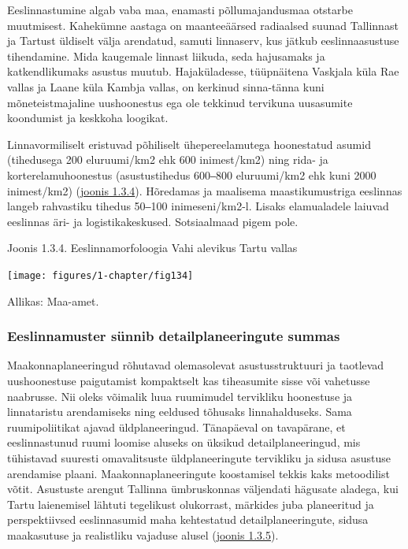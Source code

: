 \documentclass[estonian,]{article}
\begin{document}
Eeslinnastumine algab vaba maa, enamasti põllumajandusmaa otstarbe muutmisest. Kahekümne aastaga on maanteeäärsed radiaalsed suunad Tallinnast ja Tartust üldiselt välja arendatud, samuti linnaserv, kus jätkub eeslinnaasustuse tihendamine. Mida kaugemale linnast liikuda, seda hajusamaks ja katkendlikumaks asustus muutub. Hajaküladesse, tüüpnäitena Vaskjala küla Rae vallas ja Laane küla Kambja vallas, on kerkinud sinna-tänna kuni mõneteistmajaline uushoonestus ega ole tekkinud tervikuna uusasumite koondumist ja keskkoha loogikat.

Linnavormiliselt eristuvad põhiliselt ühepereelamutega hoonestatud asumid (tihedusega 200 eluruumi/km2 ehk 600 inimest/km2) ning rida- ja korterelamuhoonestus (asustustihedus 600‒800 eluruumi/km2 ehk kuni 2000 inimest/km2) (\protect\hyperlink{figure134}{joonis 1.3.4}). Hõredamas ja maalisema maastikumustriga eeslinnas langeb rahvastiku tihedus 50‒100 inimeseni/km2-l. Lisaks elamualadele laiuvad eeslinnas äri- ja logistikakeskused. Sotsiaalmaad pigem pole.

{Joonis 1.3.4.} Eeslinnamorfoloogia Vahi alevikus Tartu vallas

\begin{center}\texttt{[image: figures/1-chapter/fig134]} \end{center}

\begin{imgsource}
{Allikas:} Maa-amet.
\end{imgsource}

\hypertarget{eeslinnamuster-suxfcnnib-detailplaneeringute-summas}{%
\subsubsection*{Eeslinnamuster sünnib detailplaneeringute summas}\label{eeslinnamuster-suxfcnnib-detailplaneeringute-summas}}

Maakonnaplaneeringud rõhutavad olemasolevat asustusstruktuuri ja taotlevad uushoonestuse paigutamist kompaktselt kas tiheasumite sisse või vahetusse naabrusse. Nii oleks võimalik luua ruumimudel tervikliku hoonestuse ja linnataristu arendamiseks ning eeldused tõhusaks linnahalduseks. Sama ruumipoliitikat ajavad üldplaneeringud. Tänapäeval on tavapärane, et eeslinnastunud ruumi loomise aluseks on üksikud detailplaneeringud, mis tühistavad suuresti omavalitsuste üldplaneeringute tervikliku ja sidusa asustuse arendamise plaani.
Maakonnaplaneeringute koostamisel tekkis kaks metoodilist võtit. Asustuste arengut Tallinna ümbruskonnas väljendati hägusate aladega, kui Tartu laienemisel lähtuti tegelikust olukorrast, märkides juba planeeritud ja perspektiivsed eeslinnasumid maha kehtestatud detailplaneeringute, sidusa maakasutuse ja realistliku vajaduse alusel (\protect\hyperlink{figure135}{joonis 1.3.5}).
\end{document}
